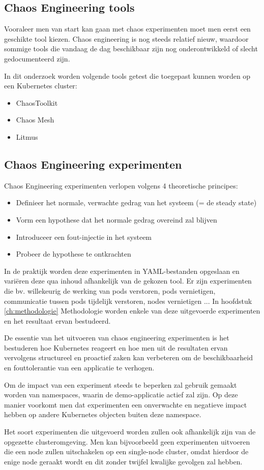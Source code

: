 \subsection{Chaos Engineering tools}

Vooraleer men van start kan gaan met chaos experimenten moet men eerst een geschikte tool kiezen. Chaos engineering is nog steeds relatief nieuw, waardoor sommige tools die vandaag de dag beschikbaar zijn nog onderontwikkeld of slecht gedocumenteerd zijn.

In dit onderzoek worden volgende tools getest die toegepast kunnen worden op een Kubernetes cluster: 
\begin{itemize}
    \item ChaosToolkit
    \item Chaos Mesh
    \item Litmus
\end{itemize} 

\subsection{Chaos Engineering experimenten}

Chaos Engineering experimenten verlopen volgens 4 theoretische principes: 
\begin{itemize}
    \item Definieer het normale, verwachte gedrag van het systeem (= de steady state)
    \item Vorm een hypothese dat het normale gedrag overeind zal blijven 
    \item Introduceer een fout-injectie in het systeem
    \item Probeer de hypothese te ontkrachten
\end{itemize}

In de praktijk worden deze experimenten in YAML-bestanden opgeslaan en variëren deze qua inhoud afhankelijk van de gekozen tool. Er zijn experimenten die bv. willekeurig de werking van pods verstoren, pods vernietigen, communicatie tussen pods tijdelijk verstoren, nodes vernietigen ... In hoofdstuk \ref{ch:methodologie} Methodologie worden enkele van deze uitgevoerde experimenten en het resultaat ervan bestudeerd. 

De essentie van het uitvoeren van chaos engineering experimenten is het bestuderen hoe Kubernetes reageert en hoe men uit de resultaten ervan vervolgens structureel en proactief zaken kan verbeteren om de beschikbaarheid en fouttolerantie van een applicatie te verhogen.  

Om de impact van een experiment steeds te beperken zal gebruik gemaakt worden van namespaces, waarin de demo-applicatie actief zal zijn. Op deze manier voorkomt men dat experimenten een onverwachte en negatieve impact hebben op andere Kubernetes objecten buiten deze namespace.

Het soort experimenten die uitgevoerd worden zullen ook afhankelijk zijn van de opgezette clusteromgeving. Men kan bijvoorbeeld geen experimenten uitvoeren die een node zullen uitschakelen op een single-node cluster, omdat hierdoor de enige node geraakt wordt en dit zonder twijfel kwalijke gevolgen zal hebben.    
